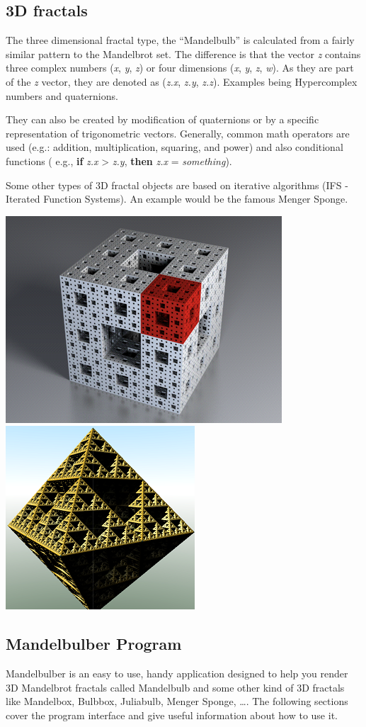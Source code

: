 \subsection{3D fractals}\label{d-fractals}

The three dimensional fractal type, the ``Mandelbulb'' is calculated from a
fairly similar pattern to the Mandelbrot set. The difference is that the vector
\emph{z} contains three complex numbers (\emph{x}, \emph{y}, \emph{z}) or four
dimensions (\emph{x}, \emph{y}, \emph{z}, \emph{w}). As they are part of the
\emph{z} vector, they are denoted as (\emph{z.x}, \emph{z.y}, \emph{z.z}).
Examples being Hypercomplex numbers and quaternions.

They can also be created by modification of quaternions or by a specific
representation of trigonometric vectors. Generally, common math operators are
used (e.g.: addition, multiplication, squaring, and power) and also
conditional functions ( e.g., \textbf{if} \emph{z.x} \textgreater{} \emph{z.y},
\textbf{then} \emph{z.x} = \emph{something}).

Some other types of 3D fractal objects are based on iterative algorithms (IFS -
Iterated Function Systems). An example would be the famous Menger Sponge.
\nopagebreak

\includegraphics[height=0.4\linewidth]{img/manual/media/menger_sponge.png} \includegraphics[height=0.4\linewidth]{img/manual/media/sierpinski.png}

\subsection{Mandelbulber Program}\label{mandelbulber-program}

Mandelbulber is an easy to use, handy application designed to help you render 3D
Mandelbrot fractals called Mandelbulb and some other kind of 3D fractals like
Mandelbox, Bulbbox, Juliabulb, Menger Sponge, \ldots{}. The following sections
cover the program interface and give useful information about how to use it.
